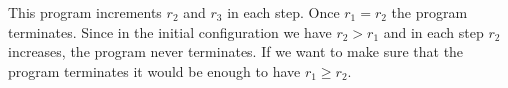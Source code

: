 This program increments $r_2$ and $r_3$ in each step. Once $r_1 = r_2$ the program terminates.
Since in the initial configuration we have $r_2 > r_1$ and in each step $r_2$ increases, the program never terminates.
\newline
If we want to make sure that the program terminates it would be enough to have $r_1 \ge r_2$.